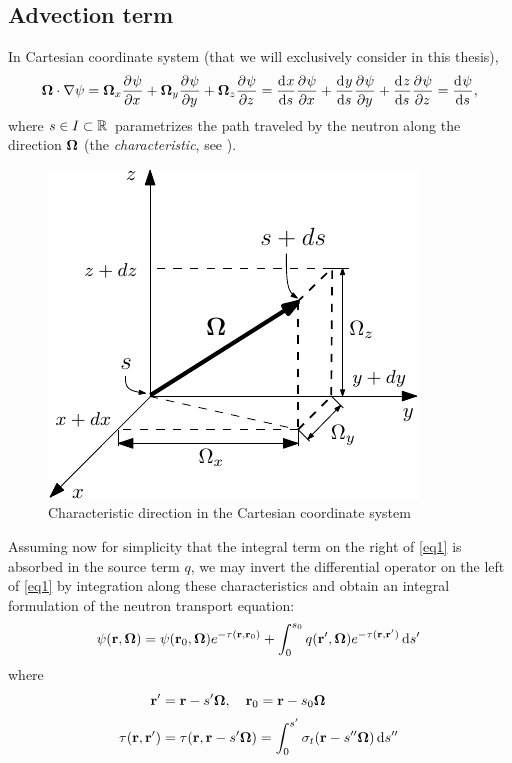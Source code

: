 \subsection{Advection term}\label{sec:advection}
In Cartesian coordinate system (that we will exclusively consider in this thesis),
$$
	\mathbf{\Omega}\cdot\nabla\psi = \mathbf{\Omega}_x\frac{\partial^{}\psi}{\partial x^{}} + \mathbf{\Omega}_y\frac{\partial^{}\psi}{\partial y^{}} + \mathbf{\Omega}_z\frac{\partial^{}\psi}{\partial z^{}} = 
	\frac{\text{d}^{}{x}}{\text{d} {s}^{}}\frac{\partial^{}\psi}{\partial x^{}} + \frac{\text{d}^{}{y}}{\text{d} {s}^{}}\frac{\partial^{}\psi}{\partial y^{}} + \frac{\text{d}^{}{z}}{\text{d} {s}^{}}\frac{\partial^{}\psi}{\partial z^{}} = \frac{\text{d}^{}{\psi}}{\text{d} {s}^{}},
$$
where $s\in I\subset \mathbb{R}^{}$ parametrizes the path traveled by the neutron along the direction $\mathbf{\Omega}$ (the
\textit{characteristic}, see ).
\begin{figure}[htp]
\begin{center}
  \includegraphics[scale=1.2]{cartesian_streaming2}
  \caption{Characteristic direction in the Cartesian coordinate system}
  \label{fig:cartesian2}
\end{center}
\end{figure}
Assuming now for simplicity that the integral term on the right of \eqref{eq1} is absorbed in the source term $q$, we
may invert the differential operator on the left of \eqref{eq1} by integration along these characteristics and obtain an
integral formulation of the neutron transport equation:
\begin{equation}\label{eq:nte-integral}
	\psi(\mathbf{r},\mathbf{\Omega}) = \psi(\mathbf{r}_0,\mathbf{\Omega})e^{-\tau(\mathbf{r},\mathbf{r}_0)} + \int_0^{s_0}
	q(\mathbf{r}',\mathbf{\Omega})e^{-\tau(\mathbf{r},\mathbf{r}')}\,\text{d}s'\,
\end{equation}
where
\begin{align}
	\mathbf{r}' &= \mathbf{r} - s' \mathbf{\Omega}, \quad \mathbf{r}_0 = \mathbf{r} - s_0 \mathbf{\Omega}\nonumber\\[.2em]
	\tau(\mathbf{r},\mathbf{r}') &= \tau(\mathbf{r},\mathbf{r}-s'\mathbf{\Omega}) = \int_0^{s'} \sigma_t(\mathbf{r} - s''\mathbf{\Omega})\,\text{d}s''\, \label{eq:tau}
\end{align}
